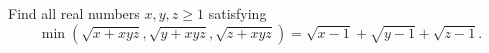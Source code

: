 Find all real numbers $x,y,z\geq 1$ satisfying \[\min(\sqrt{x+xyz},\sqrt{y+xyz},\sqrt{z+xyz})=\sqrt{x-1}+\sqrt{y-1}+\sqrt{z-1}.\]
